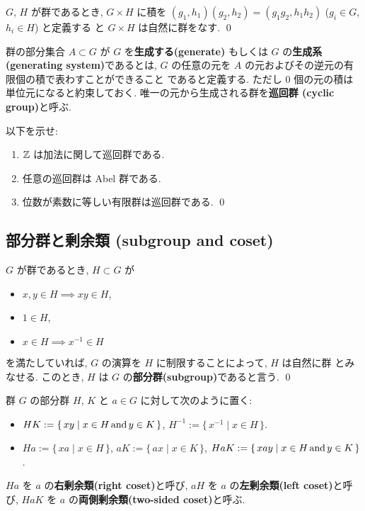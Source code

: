 \documentclass[12pt,twoside]{jarticle}
\def\AND{\mathop{\text{\rm and}}}
\def\Z{{\Bbb Z}} %
\begin{document}
\begin{question}[群の直積]
  $G$, $H$ が群であるとき, $G\times H$ に積を %
  $(g_1,h_1)(g_2,h_2) = (g_1g_2,h_1h_2)$ ($g_i\in G$, $h_i\in H$) と定義する
  と $G\times H$ は自然に群をなす.
  \qed
\end{question}

群の部分集合 $A\subset G$ が $G$ を{\bf 生成する(generate)} もしくは
$G$ の{\bf 生成系 (generating system)}であるとは, 
$G$ の任意の元を $A$ の元およびその逆元の有限個の積で表わすことができること
であると定義する. ただし $0$ 個の元の積は単位元になると約束しておく.
唯一の元から生成される群を{\bf 巡回群 (cyclic group)}と呼ぶ.

\begin{question}
  以下を示せ:
  \begin{enumerate}
  \item $\Z$ は加法に関して巡回群である.
  \item 任意の巡回群は Abel 群である.
  \item 位数が素数に等しい有限群は巡回群である.
    \qed
  \end{enumerate}
\end{question}


\subsection{部分群と剰余類 (subgroup and coset)}
\label{ss:subgroup-coset}

\begin{Definition}
  $G$ が群であるとき,  $H\subset G$ が
  \begin{itemize}
  \item $x,y\in H \implies xy\in H$,
  \item $1\in H$,
  \item $x\in H \implies x^{-1}\in H$
  \end{itemize}
  を満たしていれば, $G$ の演算を $H$ に制限することによって, $H$ は自然に群
  とみなせる. このとき, $H$ は $G$ の{\bf 部分群(subgroup)}であると言う.
  \qed
\end{Definition}

群 $G$ の部分群 $H$, $K$ と $a\in G$ に対して次のように置く:
\begin{itemize}
\item $HK := \{\, xy \mid x\in H \AND y\in K \,\}$, \quad
      $H^{-1} := \{\, x^{-1} \mid x\in H \,\}$.
\item $Ha := \{\, xa \mid x\in H \,\}$, \quad
      $aK := \{\, ax \mid x\in K \,\}$, \quad
      $HaK := \{\, xay \mid x\in H \AND y\in K\,\}$.
\end{itemize}
$Ha$ を $a$ の{\bf 右剰余類(right coset)}と呼び, 
$aH$ を $a$ の{\bf 左剰余類(left coset)}と呼び, 
$HaK$ を $a$ の{\bf 両側剰余類(two-sided coset)}と呼ぶ.
\end{document}
